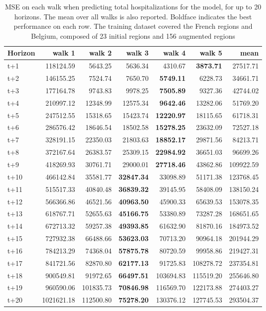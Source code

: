 \begin{table}[H]
\centering
\caption{MSE on each walk when predicting total hospitalizations for the model, for up to 20 horizons. The mean over all walks is also reported. Boldface indicates the best performance on each row. The training dataset covered the French regions and Belgium, composed of 23 initial regions and 156 augmented regions }
\label{tab:MSE_walk_custom_linear_regression}
\begin{tabular}{lrrrrrr}
\toprule
Horizon &     walk 1 &    walk 2 &   walk 3 &    walk 4 &    walk 5 &      mean \\
\midrule
t+1  & 118124.59  & 5643.25  & 5636.34  & 4310.67  & \textbf{3873.71}  & 27517.71  \\
t+2  & 146155.25  & 7524.74  & 7650.70  & \textbf{5749.11}  & 6228.73  & 34661.71  \\
t+3  & 177164.78  & 9743.83  & 9978.25  & \textbf{7505.89}  & 9327.36  & 42744.02  \\
t+4  & 210997.12  & 12348.99  & 12575.34  & \textbf{9642.46}  & 13282.06  & 51769.20  \\
t+5  & 247512.55  & 15318.65  & 15423.74  & \textbf{12220.97}  & 18115.65  & 61718.31  \\
t+6  & 286576.42  & 18646.54  & 18502.58  & \textbf{15278.25}  & 23632.09  & 72527.18  \\
t+7  & 328191.15  & 22350.03  & 21803.63  & \textbf{18852.17}  & 29871.56  & 84213.71  \\
t+8  & 372167.64  & 26383.57  & 25309.15  & \textbf{22984.92}  & 36651.03  & 96699.26  \\
t+9  & 418269.93  & 30761.71  & 29000.01  & \textbf{27718.46}  & 43862.86  & 109922.59  \\
t+10  & 466142.84  & 35581.77  & \textbf{32847.34}  & 33098.89  & 51171.38  & 123768.45  \\
t+11  & 515517.33  & 40840.48  & \textbf{36839.32}  & 39145.95  & 58408.09  & 138150.24  \\
t+12  & 566366.86  & 46521.56  & \textbf{40963.50}  & 45900.33  & 65639.53  & 153078.35  \\
t+13  & 618767.71  & 52655.63  & \textbf{45166.75}  & 53380.89  & 73287.28  & 168651.65  \\
t+14  & 672713.32  & 59257.38  & \textbf{49393.85}  & 61632.90  & 81870.16  & 184973.52  \\
t+15  & 727932.38  & 66488.66  & \textbf{53623.03}  & 70713.20  & 90964.18  & 201944.29  \\
t+16  & 784213.29  & 74368.04  & \textbf{57875.78}  & 80720.59  & 99958.86  & 219427.31  \\
t+17  & 841721.56  & 82870.80  & \textbf{62177.13}  & 91725.83  & 108278.72  & 237354.81  \\
t+18  & 900549.81  & 91972.65  & \textbf{66497.51}  & 103694.83  & 115519.20  & 255646.80  \\
t+19  & 960590.06  & 101835.73  & \textbf{70846.98}  & 116569.70  & 122173.88  & 274403.27  \\
t+20  & 1021621.18  & 112500.80  & \textbf{75278.20}  & 130376.12  & 127745.53  & 293504.37  \\


\end{tabular}
\end{table}

